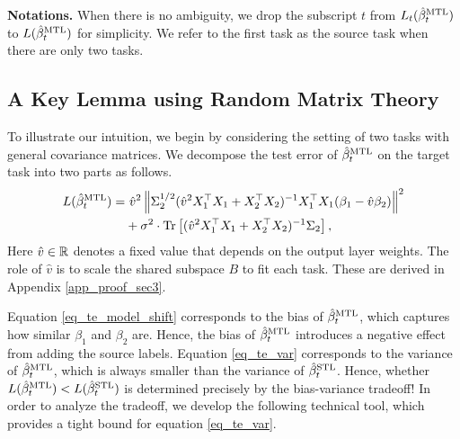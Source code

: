 \textbf{Notations.}
When there is no ambiguity, we drop the subscript $t$ from $L_t(\hat{\beta}_t^{\text{MTL}})$ to $L(\hat{\beta}_t^{\text{MTL}})$ for simplicity.
We refer to the first task as the source task when there are only two tasks.

\subsection{A Key Lemma using Random Matrix Theory}\label{label_rmt}

To illustrate our intuition, we begin by considering the setting of two tasks with general covariance matrices.
We decompose the test error of $\hat{\beta}_{t}^{\text{MTL}}$ on the target task into two parts as follows.
\begin{align}
	L(\hat{\beta}_t^{\text{MTL}}) =& ~ \hat{v}^2 \left\| \Sigma_2^{1/2} (\hat{v}^2 X_1^{\top}X_1 + X_2^{\top}X_2)^{-1}X_1^{\top}X_1 (\beta_1 - \hat{v}\beta_2) \right\|^2 \label{eq_te_model_shift} \\
	&+ \sigma^2\cdot \operatorname{Tr}\left[(\hat{v}^2 X_1^{\top}X_1 + X_2^{\top}X_2)^{-1}\Sigma_2\right], \label{eq_te_var}
\end{align}
Here $\hat{v}\in\mathbb{R}$ denotes a fixed value that depends on the output layer weights.
The role of $\hat{v}$ is to scale the shared subspace $B$ to fit each task.
These are derived in Appendix \ref{app_proof_sec3}.

Equation \eqref{eq_te_model_shift} corresponds to the bias of $\hat{\beta}_t^{\text{MTL}}$, which captures how similar $\beta_1$ and $\beta_2$ are.
Hence, the bias of $\hat{\beta}_t^{\text{MTL}}$ introduces a negative effect from adding the source labels.
Equation \eqref{eq_te_var} corresponds to the variance of $\hat{\beta}_t^{\text{MTL}}$, which is always smaller than the variance of $\hat{\beta}_t^{\text{STL}}$.
Hence, whether $L(\hat{\beta}_t^{\text{MTL}}) < L(\hat{\beta}_t^{\text{STL}})$ is determined precisely by the bias-variance tradeoff!
In order to analyze the tradeoff, we develop the following technical tool, which provides a tight bound for equation \eqref{eq_te_var}.

